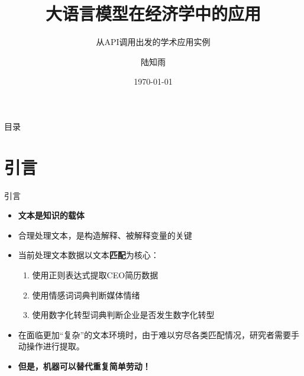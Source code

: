 \documentclass{beamer}
\title[LLMs in Economics]{\textbf{大语言模型在经济学中的应用}}
\subtitle{从API调用出发的学术应用实例}
\author{陆知雨}
\institute{中国财政发展协同创新中心\\
\vspace{2mm}财政学基地班22}
\date{\today}
\begin{document}
\begin{frame}
  \titlepage
\end{frame}

\begin{frame}{目录}
    \tableofcontents[hideallsubsections]
\end{frame}

\section{引言}
\begin{frame}{引言}
  \begin{itemize}
    \item \textbf{文本是知识的载体} 
    \item 合理处理文本，是构造解释、被解释变量的关键
    \item 当前处理文本数据以文本\textbf{匹配}为核心：
  \begin{enumerate}
  	\item 使用正则表达式提取CEO简历数据
	\item 使用情感词词典判断媒体情绪
	\item 使用数字化转型词典判断企业是否发生数字化转型
\end{enumerate}
    \item 在面临更加“复杂”的文本环境时，由于难以穷尽各类匹配情况，研究者需要手动操作进行提取。
    \item \textbf{但是，机器可以替代重复简单劳动！}
  \end{itemize}
\end{frame}
\end{document}
